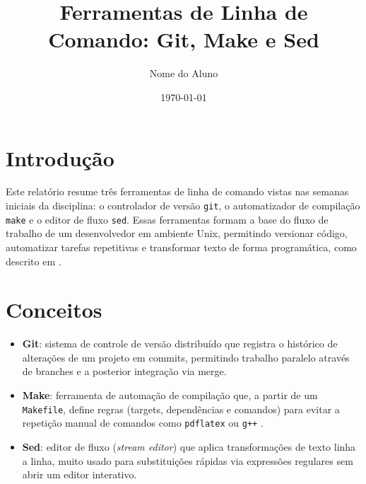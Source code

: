 \documentclass[a4paper,11pt]{article}
\title{Ferramentas de Linha de Comando: Git, Make e Sed}
\author{Nome do Aluno}
\date{\today}
\begin{document}
\maketitle

\section{Introdução}

Este relatório resume três ferramentas de linha de comando vistas nas semanas iniciais
da disciplina: o controlador de versão \texttt{git}, o automatizador de compilação
\texttt{make} e o editor de fluxo \texttt{sed}. Essas ferramentas formam a base do
fluxo de trabalho de um desenvolvedor em ambiente Unix, permitindo versionar código,
automatizar tarefas repetitivas e transformar texto de forma programática, como
descrito em \cite{gitscm2024commandline}.

\section{Conceitos}

\begin{itemize}
  \item \textbf{Git}: sistema de controle de versão distribuído que registra o
    histórico de alterações de um projeto em commits, permitindo trabalho paralelo
    através de branches e a posterior integração via merge.
  \item \textbf{Make}: ferramenta de automação de compilação que, a partir de um
    \texttt{Makefile}, define regras (targets, dependências e comandos) para evitar
    a repetição manual de comandos como \texttt{pdflatex} ou \texttt{g++}
    \cite{embarcados2024makefile}.
  \item \textbf{Sed}: editor de fluxo (\emph{stream editor}) que aplica transformações
    de texto linha a linha, muito usado para substituições rápidas via expressões
    regulares sem abrir um editor interativo.
\end{itemize}



\end{document}

